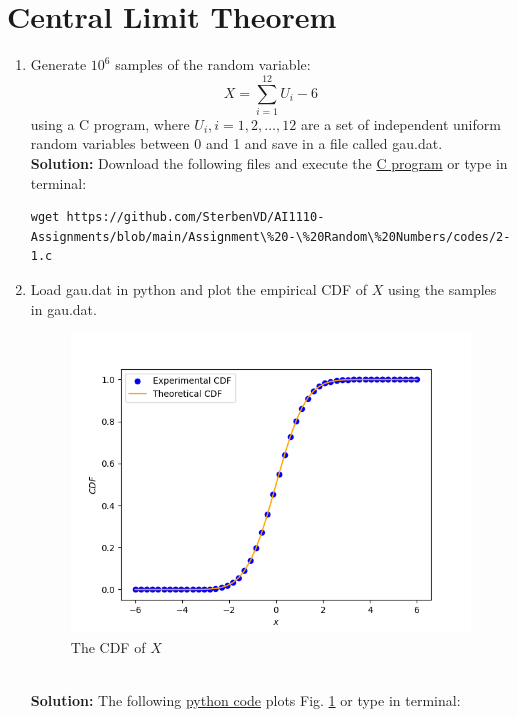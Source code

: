 \documentclass[journal,12pt,twocolumn]{IEEEtran}
\numberwithin{equation}{section}
\renewcommand\thesection{\arabic{section}}
\providecommand{\gitlink}[2]{{\color{blue}\href{https://github.com/SterbenVD/AI1110-Assignments/blob/main/Assignment\%20-\%20Random\%20Numbers/#1}{#2}}}
\newcommand{\solution}{\noindent \textbf{\\ Solution: }}
\begin{document}
\section{Central Limit Theorem}
\begin{enumerate}[label=\thesection.\arabic*,ref=\thesection.\theenumi]
    \item Generate $10^6$ samples of the random variable:
          \begin{equation}
              X = \sum_{i=1}^{12}U_i -6
          \end{equation}
          using a C program, where $U_i, i = 1,2,\dots, 12$ are  a set of independent uniform random variables between 0 and 1
          and save in a file called gau.dat.
          \solution Download the following files and execute the \gitlink{codes/2-1.c}{C program} or type in terminal:
          \begin{lstlisting}
wget https://github.com/SterbenVD/AI1110-Assignments/blob/main/Assignment\%20-\%20Random\%20Numbers/codes/2-1.c
            \end{lstlisting}
    \item Load gau.dat in python and plot the empirical CDF of $X$ using the samples in gau.dat.
          \begin{figure}[H]
              \centering
              \includegraphics[width = \columnwidth]{../figs/2_cdf}
              \caption{The CDF of $X$}
              \label{fig:2_cdf}
          \end{figure}
          \solution The following \gitlink{codes/2-2.py}{python code} plots Fig. \ref{fig:2_cdf}  or type in terminal:
          \begin{lstlisting}

\end{lstlisting}
\end{enumerate}
\end{document}
